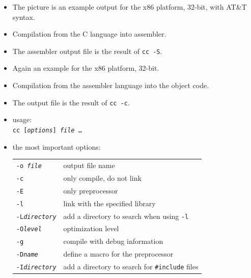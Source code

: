 \begin{itemize}
\item The picture is an example output for the x86 platform, 32-bit, with AT\&T
syntax.
\item Compilation from the C language into assembler.
\item The assembler output file is the result of \texttt{cc -S}.
\end{itemize}


\begin{slide}
\begin{center}

\end{center}
\end{slide}

\begin{itemize}
\item Again an example for the x86 platform, 32-bit.
\item Compilation from the assembler language into the object code.
\item The output file is the result of \texttt{cc -c}.
\end{itemize}


\begin{slide}
\renewcommand{\arraystretch}{1.1}
\begin{itemize}
\item usage:\\
\texttt{cc [\emph{options}] \emph{file} \dots}
\item the most important options:\\
\begin{tabular}{ll}
\texttt{-o \emph{file}} & output file name\\
\texttt{-c} & only compile, do not link\\
\texttt{-E} & only preprocessor\\ 
\texttt{-l} & link with the specified library\\
\texttt{-L\emph{directory}} & add a directory to search when using \texttt{-l}\\
\texttt{-O\emph{level}} & optimization level\\
\texttt{-g} & compile with debug information\\
\texttt{-D\emph{name}} & define a macro for the preprocessor\\
\texttt{-I\emph{directory}} & add a directory to search for \texttt{\#include} files
\end{tabular}
\end{itemize}
\end{slide}

